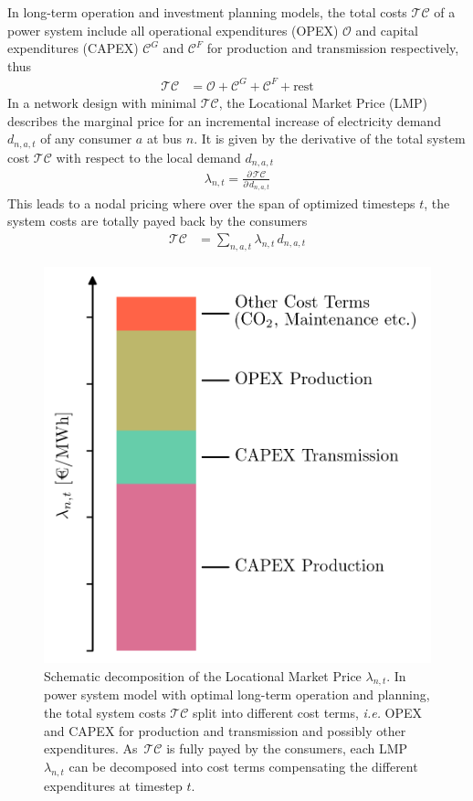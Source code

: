 \documentclass[11pt,twocolumn]{article}
\newcommand{\ie}{\textit{i.e.} }
\newcommand{\demand}[1][n]{d_{#1,a,t}}
\newcommand{\lmp}[1][n]{\lambda_{#1,t}}
\newcommand{\totalcost}{\mathcal{TC}}
\newcommand{\totalOpexGeneration}{\mathcal{O}}
\newcommand{\totalCapexGeneration}{\mathcal{C}^G}
\newcommand{\totalCapexFlow}{\mathcal{C}^F}
\newcommand{\pdv}[2]{\frac{\partial #1}{\partial #2}}
\begin{document}
In long-term operation and investment planning models, the total costs $\totalcost$ of a power system include all operational expenditures (OPEX) $\totalOpexGeneration$ and capital expenditures (CAPEX) $\totalCapexGeneration$ and $\totalCapexFlow$ for production  and transmission respectively, thus
\begin{align}
\totalcost &= \totalOpexGeneration + \totalCapexGeneration +  \totalCapexFlow + \text{rest}
\label{eq:total_cost_terms}
\end{align}
In a network design with minimal $\totalcost$, the Locational Market Price (LMP) describes the marginal price for an incremental increase of electricity demand $\demand$ of any consumer $a$ at bus $n$. It is given by the derivative of the total system cost $\totalcost$ with respect to the local demand $\demand$
\begin{align}
\lmp = \pdv{\,\totalcost}{\,\demand}
\label{eq:total_cost_derivative}
\end{align}
This leads to a nodal pricing where over the span of optimized timesteps $t$, the system costs are totally payed back by the consumers 
\begin{align}
\totalcost &=  \sum_{n,a,t} \lmp \, \demand
\label{eq:total_cost_sum}
\end{align}
% 
\begin{figure}[h]
\centering
\includegraphics[width=.8\linewidth]{price_decomposition.png}
\caption{Schematic decomposition of the Locational Market Price $\lmp$. In power system model with optimal long-term operation and planning, the total system costs $\totalcost$ split into different cost terms, \ie OPEX and CAPEX for production and transmission and possibly other expenditures. As $\,\totalcost$ is fully payed by the consumers, each LMP $\lmp$ can be decomposed into cost terms compensating the different expenditures at timestep $t$.}
\label{fig:price_decomposition}
\end{figure}
\end{document}
